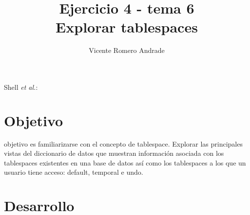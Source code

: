 \documentclass[journal]{IEEEtran}
\begin{document}
\title{Ejercicio 4 - tema 6 \\ Explorar tablespaces}
%
\author{Vicente Romero Andrade}

%
{Shell \MakeLowercase{\textit{et al.}}: }

\maketitle


\IEEEpeerreviewmaketitle

\section{Objetivo}

 objetivo es familiarizarse con el concepto de tablespace. 
Explorar las principales vistas del diccionario de datos que muestran información asociada con los
tablespaces existentes en una base de datos así como los tablespaces a los que un usuario tiene acceso: default, temporal e undo.

\section{Desarrollo}
\end{document}

